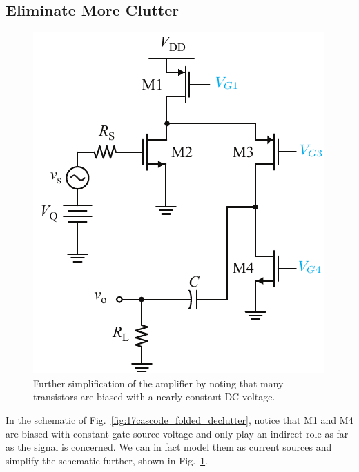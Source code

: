 \subsection{Eliminate More Clutter}
\begin{figure}[tb]
\centering
\includegraphics[scale=1]{18cascode_folded_dc}
\caption{Further simplification of the amplifier by noting that many transistors are biased with a nearly constant DC voltage.}
\label{fig:18cascode_folded_dc}
\end{figure}
In the schematic of Fig.~\ref{fig:17cascode_folded_declutter}, notice that M1 and M4 are biased with constant gate-source voltage and only play an indirect role as far as the signal is concerned.  We can in fact model them as current sources and simplify the schematic further, shown in Fig.~\ref{fig:18cascode_folded_dc}.

